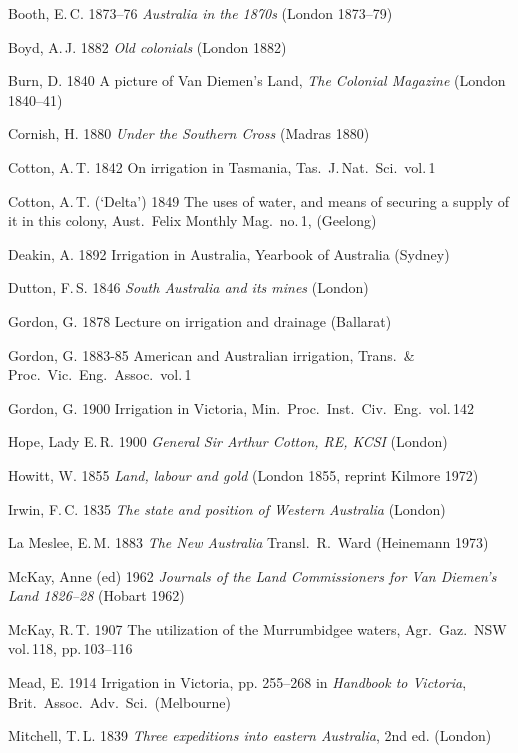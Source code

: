 Booth, E.\,C. 1873--76 \textit{Australia in the 1870s} (London
1873--79)

Boyd, A.\,J. 1882 \textit{Old colonials} (London 1882)

Burn, D. 1840 A picture of Van Diemen's Land, \textit{The Colonial
Magazine} (London 1840--41)

Cornish, H. 1880 \textit{Under the Southern Cross} (Madras 1880)

Cotton, A.\,T. 1842 On irrigation in Tasmania, Tas.\
J.\,Nat.\ Sci.\ vol.\,1

Cotton, A.\,T. (`Delta') 1849 The uses of water, and means of securing
a supply of it in this colony, Aust.\ Felix Monthly Mag.\ no.\,1,
(Geelong)

Deakin, A.  1892 Irrigation in Australia, Yearbook of Australia
(Sydney)

Dutton, F.\,S. 1846 \textit{South Australia and its mines} (London)

Gordon, G. 1878 Lecture on irrigation and drainage (Ballarat)

Gordon, G. 1883-85 American and Australian irrigation, Trans.\ \&
Proc.\ Vic.\ Eng.\ Assoc.\ vol.\,1

Gordon, G. 1900 Irrigation in Victoria, Min.\ Proc.\ Inst.\ Civ.\
Eng.\ vol.\,142

Hope, Lady E.\,R. 1900 \textit{General Sir Arthur Cotton, RE, KCSI}
(London)

Howitt, W. 1855 \textit{Land, labour and gold} (London 1855, reprint
Kilmore 1972)

Irwin, F.\,C. 1835 \textit{The state and position of Western
Australia} (London)

La Meslee, E.\,M. 1883 \textit{The New Australia} Transl.\ R.~Ward
(Heinemann 1973)

McKay, Anne (ed) 1962 \textit{Journals of the Land Commissioners for
Van Diemen's Land 1826--28} (Hobart 1962)

McKay, R.\,T. 1907 The utilization of the Murrumbidgee waters, Agr.\
Gaz.\ NSW vol.\,118, pp.\,103--116

Mead, E. 1914 Irrigation in Victoria, pp. 255--268 in \textit{Handbook
to Victoria}, Brit.\ Assoc.\ Adv.\ Sci.\ (Melbourne)

\refitem
Mitchell, T.\,L. 1839 \textit{Three expeditions into eastern
Australia}, 2nd ed. (London)

